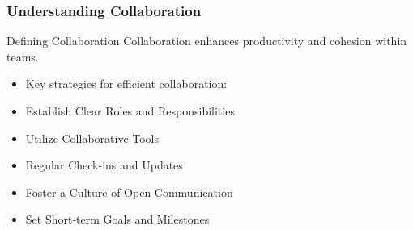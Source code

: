 \documentclass[aspectratio=169]{beamer}
\begin{document}
\begin{frame}[fragile]
    \frametitle{Understanding Collaboration}
    \begin{block}{Defining Collaboration}
        Collaboration enhances productivity and cohesion within teams. 
    \end{block}
    \begin{itemize}
        \item Key strategies for efficient collaboration:
        \item Establish Clear Roles and Responsibilities
        \item Utilize Collaborative Tools
        \item Regular Check-ins and Updates
        \item Foster a Culture of Open Communication
        \item Set Short-term Goals and Milestones
    \end{itemize}
\end{frame}
\end{document}
